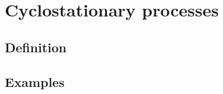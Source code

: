 \chapter{Cyclostationary \stab processes}\label{chap::cyclo_stab}
\section{Definition}
\section{Examples}